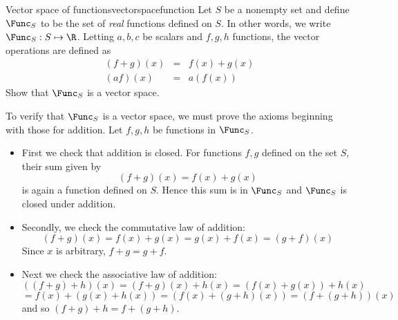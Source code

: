 \begin{example}{Vector space of functions}{vectorspacefunction}
Let $S$ be a nonempty set and define $\Func_S$ to be the set of \textit{real} functions
defined on $S$. In other words, we write $\Func_S: S \mapsto \R$. Letting $a,b,c$ be scalars and $f,g,h$ functions, the
vector operations are defined as
\begin{eqnarray*}
\left( f+g\right) \left( x\right)  &=&f\left( x\right) +g\left(
x\right)  \\
\left( af\right) \left( x\right)  &=&a\left( f\left( x\right) \right)
\end{eqnarray*}
Show that $\Func_S$ is a vector space. 
\end{example}

\begin{solution}
To verify that $\Func_S$ is a vector space, we must prove the axioms beginning with those for addition. Let $f, g, h$ be functions in $\Func_S$. 

\begin{itemize}
\item
First we check that addition is closed.  For functions $f, g$ defined on the set $S$, their sum given by 
\[
(f+g)(x) = f(x)+g(x)
\]
is again a function defined on $S$. Hence this sum is in $\Func_S$ and $\Func_S$ is closed under addition. 

\item
Secondly, we check the commutative law of addition:
\begin{equation*}
\left( f+g\right) \left( x\right) =f\left( x\right) +g\left( x\right)
=g\left( x\right) +f\left( x\right) =\left( g+f\right) \left( x\right)
\end{equation*}
Since $x$ is arbitrary, $f+g=g+f$.

\item
Next we check the associative law of addition:
\begin{equation*}
\left( \left( f+g\right) +h\right) \left( x\right) = \left( f+g\right)
\left( x\right) +h\left( x\right) =\left( f\left( x\right) +g\left( x\right)
\right) +h\left( x\right)
\end{equation*}
\begin{equation*}
=f\left( x\right) +\left( g\left( x\right) +h\left( x\right) \right) =\left(
f\left( x\right) +\left( g+h\right) \left( x\right) \right) =\left( f+\left(
g+h\right) \right) \left( x\right)
\end{equation*}
and so $\left( f+g\right) +h=f+\left( g+h\right) .$


\end{itemize}
\end{solution}
